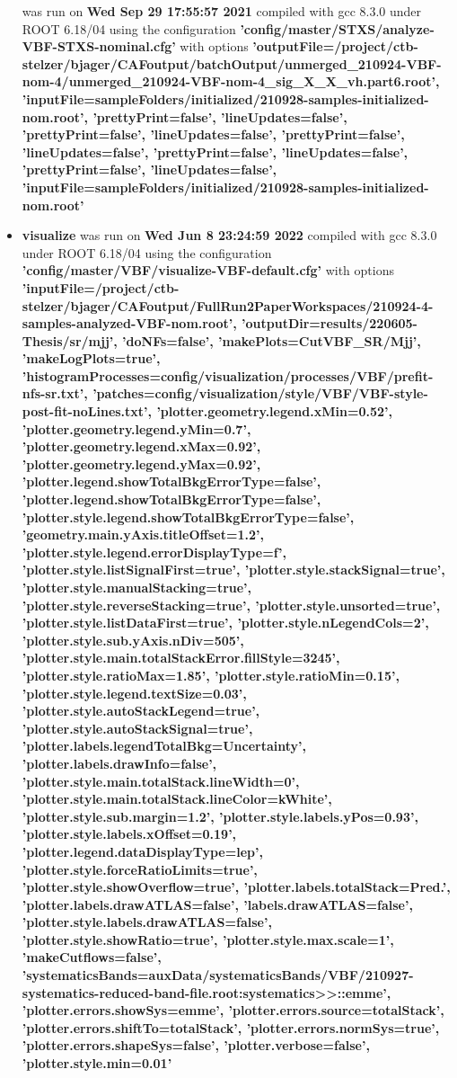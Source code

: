 \documentclass{article}
\begin{document}
\begin{itemize}
was run on \textbf{Wed Sep 29 17:55:57 2021} compiled with gcc 8.3.0 under ROOT 6.18/04 using the configuration \textbf{'config/master/STXS/analyze-VBF-STXS-nominal.cfg'} with options \textbf{'outputFile=/project/ctb-stelzer/bjager/CAFoutput/batchOutput/unmerged\_210924-VBF-nom-4/unmerged\_210924-VBF-nom-4\_sig\_X\_X\_vh.part6.root', 'inputFile=sampleFolders/initialized/210928-samples-initialized-nom.root', 'prettyPrint=false', 'lineUpdates=false', 'prettyPrint=false', 'lineUpdates=false', 'prettyPrint=false', 'lineUpdates=false', 'prettyPrint=false', 'lineUpdates=false', 'prettyPrint=false', 'lineUpdates=false', 'inputFile=sampleFolders/initialized/210928-samples-initialized-nom.root'} \item \textbf{visualize} was run on \textbf{Wed Jun  8 23:24:59 2022} compiled with gcc 8.3.0 under ROOT 6.18/04 using the configuration \textbf{'config/master/VBF/visualize-VBF-default.cfg'} with options \textbf{'inputFile=/project/ctb-stelzer/bjager/CAFoutput/FullRun2PaperWorkspaces/210924-4-samples-analyzed-VBF-nom.root', 'outputDir=results/220605-Thesis/sr/mjj', 'doNFs=false', 'makePlots=CutVBF\_SR/Mjj', 'makeLogPlots=true', 'histogramProcesses=config/visualization/processes/VBF/prefit-nfs-sr.txt', 'patches=config/visualization/style/VBF/VBF-style-post-fit-noLines.txt', 'plotter.geometry.legend.xMin=0.52', 'plotter.geometry.legend.yMin=0.7', 'plotter.geometry.legend.xMax=0.92', 'plotter.geometry.legend.yMax=0.92', 'plotter.legend.showTotalBkgErrorType=false', 'plotter.legend.showTotalBkgErrorType=false', 'plotter.style.legend.showTotalBkgErrorType=false', 'geometry.main.yAxis.titleOffset=1.2', 'plotter.style.legend.errorDisplayType=f', 'plotter.style.listSignalFirst=true', 'plotter.style.stackSignal=true', 'plotter.style.manualStacking=true', 'plotter.style.reverseStacking=true', 'plotter.style.unsorted=true', 'plotter.style.listDataFirst=true', 'plotter.style.nLegendCols=2', 'plotter.style.sub.yAxis.nDiv=505', 'plotter.style.main.totalStackError.fillStyle=3245', 'plotter.style.ratioMax=1.85', 'plotter.style.ratioMin=0.15', 'plotter.style.legend.textSize=0.03', 'plotter.style.autoStackLegend=true', 'plotter.style.autoStackSignal=true', 'plotter.labels.legendTotalBkg=Uncertainty', 'plotter.labels.drawInfo=false', 'plotter.style.main.totalStack.lineWidth=0', 'plotter.style.main.totalStack.lineColor=kWhite', 'plotter.style.sub.margin=1.2', 'plotter.style.labels.yPos=0.93', 'plotter.style.labels.xOffset=0.19', 'plotter.legend.dataDisplayType=lep', 'plotter.style.forceRatioLimits=true', 'plotter.style.showOverflow=true', 'plotter.labels.totalStack=Pred.', 'plotter.labels.drawATLAS=false', 'labels.drawATLAS=false', 'plotter.style.labels.drawATLAS=false', 'plotter.style.showRatio=true', 'plotter.style.max.scale=1', 'makeCutflows=false', 'systematicsBands=auxData/systematicsBands/VBF/210927-systematics-reduced-band-file.root:systematics>>::emme', 'plotter.errors.showSys=emme', 'plotter.errors.source=totalStack', 'plotter.errors.shiftTo=totalStack', 'plotter.errors.normSys=true', 'plotter.errors.shapeSys=false', 'plotter.verbose=false', 'plotter.style.min=0.01'} \end{itemize}
\end{document}
